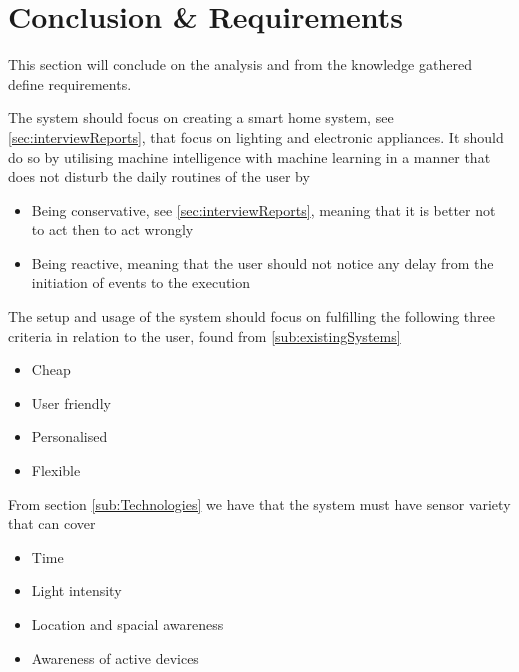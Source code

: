 \section{Conclusion \& Requirements}
This section will conclude on the analysis and from the knowledge gathered define requirements.

The system should focus on creating a smart home system, see \cref{sec:interviewReports}, that focus on lighting and electronic appliances. It should do so by utilising machine intelligence with machine learning in a manner that does not disturb the daily routines of the user by
\begin{itemize}
  \item Being conservative, see \cref{sec:interviewReports}, meaning that it is better not to act then to act wrongly
  \item Being reactive, meaning that the user should not notice any delay from the initiation of events to the execution
\end{itemize}

The setup and usage of the system should focus on fulfilling the following three criteria in relation to the user, found from \cref{sub:existingSystems}
\begin{itemize}
  \item Cheap
  \item User friendly
  \item Personalised
  \item Flexible
\end{itemize}

From section \cref{sub:Technologies} we have that the system must have sensor variety that can cover
\begin{itemize}
  \item Time
  \item Light intensity
  \item Location and spacial awareness
  \item Awareness of active devices
\end{itemize}
